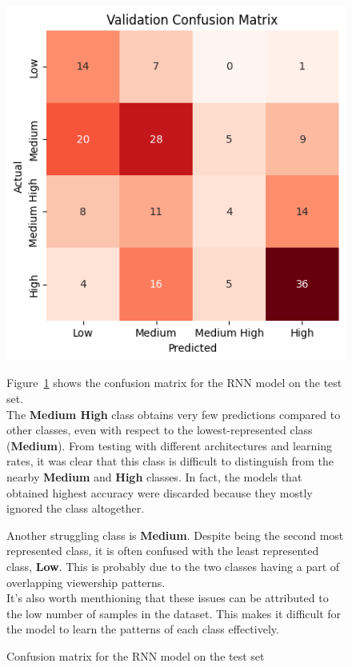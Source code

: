 \begin{figure}[H]
    \centering
    \begin{minipage}{0.41\textwidth}
        \includegraphics[width=1\textwidth]{plotsss/rnn_cm.png}
        \caption{Confusion matrix for the RNN model on the test set}
        \label{fig:cm_rnn}
    \end{minipage}
    \hfill
    \begin{minipage}{0.55\textwidth}
        Figure~\ref{fig:cm_rnn} shows the confusion matrix for the RNN
        model on the test set.\\

        The \textbf{Medium High} class obtains very few predictions
        compared to other classes, even with respect to the lowest-represented class
        (\textbf{Medium}).
        From testing with different architectures and
        learning rates, it was clear that this class is difficult to distinguish from
        the nearby \textbf{Medium} and \textbf{High} classes.
        In fact, the models that obtained highest accuracy were discarded because
        they mostly ignored the class altogether.

        Another struggling class is \textbf{Medium}. Despite being the second most represented
        class, it is often confused with the least represented class, \textbf{Low}.
        This is probably due to the two classes having a part of overlapping viewership patterns.\\

        It's also worth menthioning that these issues can be attributed to the low
        number of samples in the dataset. This makes it difficult for the model
        to learn the patterns of each class effectively.
    \end{minipage}
\end{figure}

